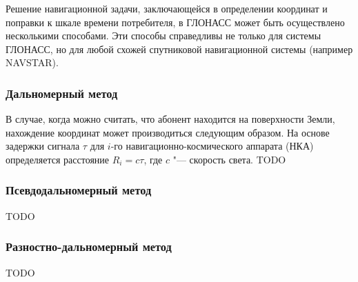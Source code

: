 \documentclass[../main.tex]{subfiles}
\begin{document}
Решение навигационной задачи, заключающейся в определении координат и поправки к шкале времени потребителя, в ГЛОНАСС может быть осуществлено несколькими способами. Эти способы справедливы не только для системы ГЛОНАСС, но для любой схожей спутниковой навигационной системы (например NAVSTAR).

\subsubsection{Дальномерный метод}
В случае, когда можно считать, что абонент находится на поверхности Земли, нахождение координат может производиться следующим образом. На основе задержки сигнала $\tau$ для $i$-го навигационно-космического аппарата (НКА) определяется расстояние $R_i = c\tau$, где $c$ "--- скорость света. TODO

\subsubsection{Псевдодальномерный метод}
TODO

\subsubsection{Разностно-дальномерный метод}
TODO
\end{document}
